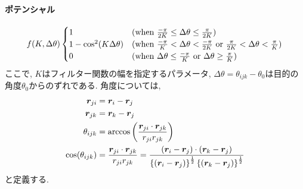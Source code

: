 \paragraph{ポテンシャル}
\begin{align}
   f(K, \Delta \theta)
   \begin{cases}
      1 &
      (\text{when}~\frac{-\pi}{2K} \le \Delta \theta \le \frac{\pi}{2K})\\
      1 - \cos^{2} (K \Delta \theta) &
      (\text{when}~\frac{-\pi}{K} < \Delta \theta < \frac{-\pi}{2K}~
       \text{or}~  \frac{\pi}{2K} < \Delta \theta < \frac{\pi}{K}) \\
      0 &
      (\text{when}~ \Delta \theta \le \frac{-\pi}{K}~
       \text{or}~ \Delta \theta \ge \frac{\pi}{K})
   \end{cases}
   \notag
\end{align}
ここで, $K$はフィルター関数の幅を指定するパラメータ, $\Delta \theta = \theta_{ijk} - \theta_{0}$は目的の角度$\theta_{0}$からのずれである.
角度については,
\begin{align}
   \bm{r}_{ji}
   &= \bm{r}_{i} - \bm{r}_{j}
   \notag \\
   \bm{r}_{jk}
   &= \bm{r}_{k} - \bm{r}_{j}
   \notag \\
    \theta_{ijk}
   &= \arccos \left( \frac{\bm{r}_{ji} \cdot \bm{r}_{jk}}{r_{ji} r_{jk}} \right)
   \notag \\
   \cos(\theta_{ijk})
   &= \frac{\bm{r}_{ji} \cdot \bm{r}_{jk}}{r_{ji} r_{jk}}
   = \frac{(\bm{r}_{i} - \bm{r}_{j}) \cdot (\bm{r}_{k} - \bm{r}_{j})}
         {\left\{(\bm{r}_{i} - \bm{r}_{j})\right\}^{\frac{1}{2}}
          \left\{(\bm{r}_{k} - \bm{r}_{j})\right\}^{\frac{1}{2}}}
   \notag
\end{align}
と定義する.

